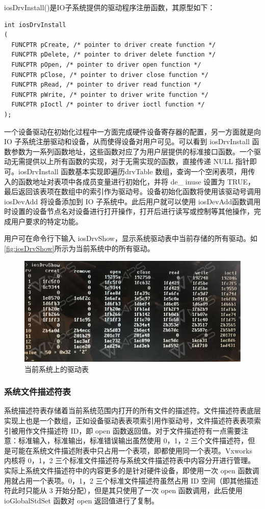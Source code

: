 	iosDrvInstall()是IO子系统提供的驱动程序注册函数，其原型如下：
\lstset{language=C}
\begin{lstlisting}
int iosDrvInstall 
( 
  FUNCPTR pCreate, /* pointer to driver create function */ 
  FUNCPTR pDelete, /* pointer to driver delete function */ 
  FUNCPTR pOpen, /* pointer to driver open function */ 
  FUNCPTR pClose, /* pointer to driver close function */ 
  FUNCPTR pRead, /* pointer to driver read function */ 
  FUNCPTR pWrite, /* pointer to driver write function */ 
  FUNCPTR pIoctl /* pointer to driver ioctl function */ 
); 
\end{lstlisting}
一个设备驱动在初始化过程中一方面完成硬件设备寄存器的配置，另一方面就是向 IO 子系统注册驱动和设备，从而使得设备对用户可见。可以看到 iosDrvInstall 函数参数为一系列函数地址，这些函数对应了为用户层提供的标准接口函数。一个驱动无需提供以上所有函数的实现，对于无需实现的函数，直接传递 NULL 指针即可。iosDrvInstall 函数基本实现即遍历drvTable 数组，查询一个空闲表项，用传入的函数地址对表项中各成员变量进行初始化，并将 de\_ inuse 设置为 TRUE，最后返回该表项在数组中的索引作为驱动号。设备初始化函数将使用该驱动号调用 iosDevAdd 将设备添加到 IO 子系统中。此后用户就可以使用 iosDevAdd函数调用时设置的设备节点名对设备进行打开操作，打开后进行读写或控制等其他操作，完成用户要求的特定功能。

	用户可在命令行下输入 iosDrvShow，显示系统驱动表中当前存储的所有驱动。如\autoref{fig:iosDrvShow}所示为当前系统中的所有驱动。
\begin{figure}[!h]
\centering
\includegraphics[width=.9\textwidth]{./graphics/iosDrvShow.pdf}
\caption{当前系统上的驱动表}\label{fig:iosDrvShow}
\end{figure}

\subsubsection{系统文件描述符表}
	系统描述符表存储着当前系统范围内打开的所有文件的描述符。文件描述符表底层实现上也是一个数组，正如设备驱动表表项索引用作驱动号，文件描述符表表项索引被用作文件描述符 ID，即 open 函数返回值。对于文件描述符有一点需要注意：标准输入，标准输出，标准错误输出虽然使用 0，1，2 三个文件描述符，但是可能在系统文件描述附表中只占用一个表项，即都使用同一个表项。Vxworks 内核将 0，1，2 三个标准文件描述符与系统文件描述符表中内容分开进行管理。实际上系统文件描述符中的内容更多的是针对硬件设备，即使用一次 open 函数调用就占用一个表项。0，1，2 三个标准文件描述符虽然占用 ID 空间（即其他描述符此时只能从 3 开始分配），但是其只使用了一次 open 函数调用，此后使用 ioGlobalStdSet 函数对 open 返回值进行了复制。
	
